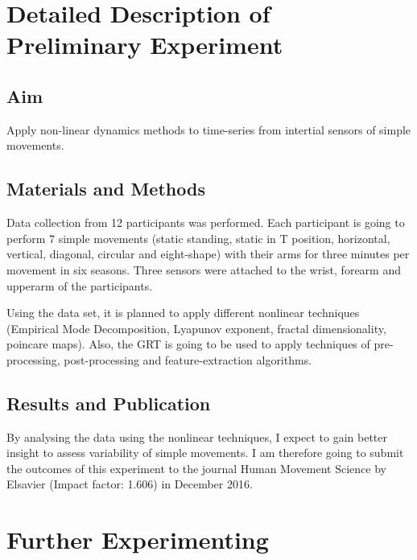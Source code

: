 \documentclass[9pt,journal,onecolumn,compsoc]{IEEEtran}
\begin{document}
% 
 
\section{Detailed Description of Preliminary Experiment}

\subsection{Aim}
Apply non-linear dynamics methods to time-series from intertial sensors of 
simple movements.

\subsection{Materials and Methods}
Data collection from 12 participants was performed. 
Each participant is going to 
perform 7 simple movements (static standing, static in T position, horizontal,
vertical, diagonal, circular and eight-shape) with their arms for three minutes per movement
in six seasons.
Three sensors were attached to the wrist, forearm and upperarm of the participants.

Using the data set, it is planned to apply different nonlinear techniques 
(Empirical Mode Decomposition, Lyapunov exponent, fractal dimensionality, poincare maps).
Also, the GRT is going to be used to apply techniques of 
pre-processing, post-processing and feature-extraction algorithms.

\subsection{Results and Publication}
By analysing the data using the nonlinear techniques, I expect to
gain better insight to assess variability of simple movements.
I am therefore going to submit the outcomes of this experiment to
the journal Human Movement Science by Elsavier (Impact factor: 1.606) in December 2016.


\section{Further Experimenting}
\end{document}
